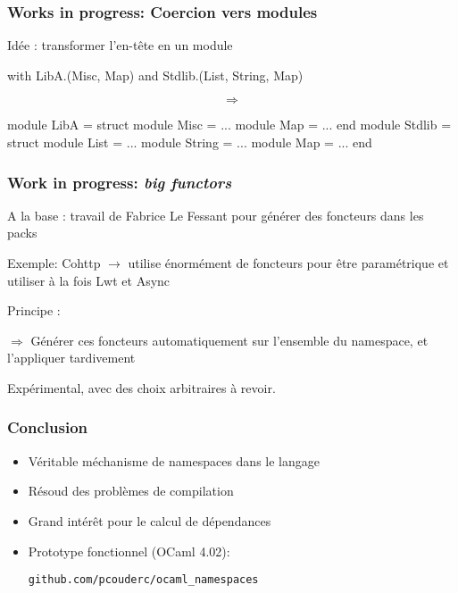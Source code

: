 \documentclass{beamer}
\begin{document}
\begin{frame}[fragile]
\frametitle{Works in progress: Coercion vers modules}

Idée : transformer l'en-tête en un module

\begin{OCaml}
with LibA.(Misc, Map)
and Stdlib.(List, String, Map)
\end{OCaml}

$$\Rightarrow$$

\pause

\begin{OCaml}
module LibA = struct
  module Misc = ...
  module Map = ...
end
module Stdlib = struct
  module List = ...
  module String = ...
  module Map = ...
end
\end{OCaml}



\end{frame}

\begin{frame}
\frametitle{Work in progress: \emph{big functors}}

A la base : travail de Fabrice Le Fessant pour générer des foncteurs dans les packs

\bigskip

Exemple: Cohttp $\rightarrow$ utilise énormément de foncteurs pour être
paramétrique et utiliser à la fois Lwt et Async

\bigskip

Principe :

$\Rightarrow$ Générer ces foncteurs automatiquement sur l'ensemble du namespace,
et l'appliquer tardivement

\medskip

Expérimental, avec des choix arbitraires à revoir.

\end{frame}

\begin{frame}[fragile]
\frametitle{Conclusion}

\begin{itemize}
\item Véritable méchanisme de namespaces dans le langage
\item Résoud des problèmes de compilation
\item Grand intérêt pour le calcul de dépendances
\item Prototype fonctionnel (OCaml 4.02):

\texttt{github.com/pcouderc/ocaml_namespaces}
\end{itemize}

\end{frame}
\end{document}
